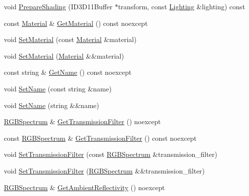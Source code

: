 \begin{DoxyCompactItemize}
\item 
void \hyperlink{structmage_1_1_shaded_material_a53336b2d98e414a73ad64f3176b5e996}{Prepare\+Shading} (I\+D3\+D11\+Buffer $\ast$transform, const \hyperlink{structmage_1_1_lighting}{Lighting} \&lighting) const
\item 
const \hyperlink{structmage_1_1_material}{Material} \& \hyperlink{structmage_1_1_shaded_material_a4de9a6fe5389da19cbe3e5b073622374}{Get\+Material} () const noexcept
\item 
void \hyperlink{structmage_1_1_shaded_material_aca5966123c3267d431539bea500d244b}{Set\+Material} (const \hyperlink{structmage_1_1_material}{Material} \&material)
\item 
void \hyperlink{structmage_1_1_shaded_material_a340a8eb8690a6ba809c33432607d02dd}{Set\+Material} (\hyperlink{structmage_1_1_material}{Material} \&\&material)
\item 
const string \& \hyperlink{structmage_1_1_shaded_material_af7be0282cc547159cd733475f63eb982}{Get\+Name} () const noexcept
\item 
void \hyperlink{structmage_1_1_shaded_material_a3f8d05c818362ef37bfcf9a02769d0ff}{Set\+Name} (const string \&name)
\item 
void \hyperlink{structmage_1_1_shaded_material_aa2a120f4df21d5fbde733ce12a348571}{Set\+Name} (string \&\&name)
\item 
\hyperlink{structmage_1_1_r_g_b_spectrum}{R\+G\+B\+Spectrum} \& \hyperlink{structmage_1_1_shaded_material_a6f7957db6f13954152ffb9b71644fe80}{Get\+Transmission\+Filter} () noexcept
\item 
const \hyperlink{structmage_1_1_r_g_b_spectrum}{R\+G\+B\+Spectrum} \& \hyperlink{structmage_1_1_shaded_material_ac1735260a6d52bacbaea76594f7fbfdb}{Get\+Transmission\+Filter} () const noexcept
\item 
void \hyperlink{structmage_1_1_shaded_material_a8be0968eae5daf3d566ee063925671c6}{Set\+Transmission\+Filter} (const \hyperlink{structmage_1_1_r_g_b_spectrum}{R\+G\+B\+Spectrum} \&transmission\+\_\+filter)
\item 
void \hyperlink{structmage_1_1_shaded_material_a431b82b0149bda7229ba2d12123e4315}{Set\+Transmission\+Filter} (\hyperlink{structmage_1_1_r_g_b_spectrum}{R\+G\+B\+Spectrum} \&\&transmission\+\_\+filter)
\item 
\hyperlink{structmage_1_1_r_g_b_spectrum}{R\+G\+B\+Spectrum} \& \hyperlink{structmage_1_1_shaded_material_afb2818be33977199ecb93689a76e5622}{Get\+Ambient\+Reflectivity} () noexcept
\item 

\end{DoxyCompactItemize}

